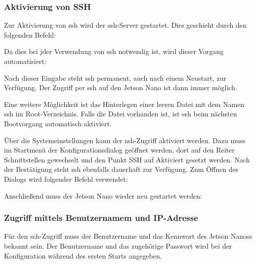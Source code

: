 \subsubsection{Aktivierung von SSH}


Zur Aktivierung von \ac{ssh} wird der \ac{ssh}-Server gestartet. Dies geschieht durch den folgenden Befehl:

\medskip


\medskip

Da dies bei jder Verwendung von \ac{ssh} notwendig ist, wird dieser Vorgang automatisiert:

\medskip


\medskip

Nach dieser Eingabe steht \ac{ssh} permanent, auch nach einem Neustart, zur Verfügung. Der Zugriff per \ac{ssh} auf den Jetson Nano ist dann immer möglich.

\bigskip

Eine weitere Möglichkeit  ist das Hinterlegen einer leeren Datei mit dem Namen \glqq ssh\grqq{} im Root-Verzeichnis. Falls die Datei vorhanden ist, ist \ac{ssh} beim nächsten Bootvorgang automatisch aktiviert.

\bigskip

Über die Systemeinstellungen kann der \ac{ssh}-Zugriff aktiviert werden. Dazu muss im Startmenü  der Konfigurationsdialog geöffnet werden, dort auf den Reiter \glqq Schnittstellen\grqq{} gewechselt und den Punkt \glqq SSH\grqq{} auf \glqq Aktiviert\grqq{} gesetzt werden. Nach der Bestätigung steht \ac{ssh} ebenfalls dauerhaft zur Verfügung. Zum Öffnen des Dialogs wird folgender Befehl verwendet:

\medskip


\medskip

Anschließend muss der Jetson Nano wieder neu gestartet werden:

\medskip



\subsubsection{Zugriff mittels Benutzernamem und IP-Adresse}

Für den \ac{ssh}-Zugriff muss der Benutzername und das Kennwort des Jetson Nanoss bekannt sein. Der Benutzername und das zugehörige Passwort wird bei der Konfiguration während des ersten Starts angegeben.


